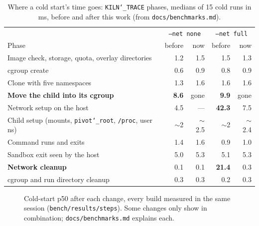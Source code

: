 \documentclass[10pt,letterpaper]{article}
\newcommand{\code}[1]{\texttt{#1}}
\newcommand{\us}{\char`\_}
\begin{document}
\begin{table}[H]
\centering\small
\caption{Where a cold start's time goes: \code{KILN\us{}TRACE} phases, medians of
15 cold runs in ms, before and after this work (from \code{docs/benchmarks.md}).}
\label{tab:trace}
\begin{tabular}{@{}lrrrr@{}}
\toprule
 & \multicolumn{2}{c}{\code{--net none}} & \multicolumn{2}{c}{\code{--net full}} \\
Phase & before & now & before & now \\
\midrule
Image check, storage, quota, overlay directories & 1.2 & 1.5 & 1.5 & 1.3 \\
cgroup create & 0.6 & 0.9 & 0.8 & 0.9 \\
Clone with five namespaces & 1.3 & 1.6 & 1.6 & 1.6 \\
\textbf{Move the child into its cgroup} & \textbf{8.6} & gone & \textbf{9.9} & gone \\
Network setup on the host & 4.5 & --- & \textbf{42.3} & 7.5 \\
Child setup (mounts, \code{pivot\us{}root}, \code{/proc}, user ns) & ${\sim}$2 & ${\sim}$2.5 & ${\sim}$2 & ${\sim}$2.4 \\
Command runs and exits & 1.4 & 1.6 & 0.9 & 1.0 \\
Sandbox exit seen by the host & 5.0 & 5.3 & 5.1 & 5.3 \\
\textbf{Network cleanup} & 0.1 & 0.1 & \textbf{21.4} & 0.3 \\
cgroup and run directory cleanup & 0.3 & 0.3 & 0.2 & 0.3 \\
\bottomrule
\end{tabular}
\end{table}

\begin{figure}[H]
\centering
{}
\caption{Cold-start p50 after each change, every build measured in the same
session (\code{bench/results/steps}). Some changes only show in combination;
\code{docs/benchmarks.md} explains each.}
\label{fig:steps}
\end{figure}
\end{document}
